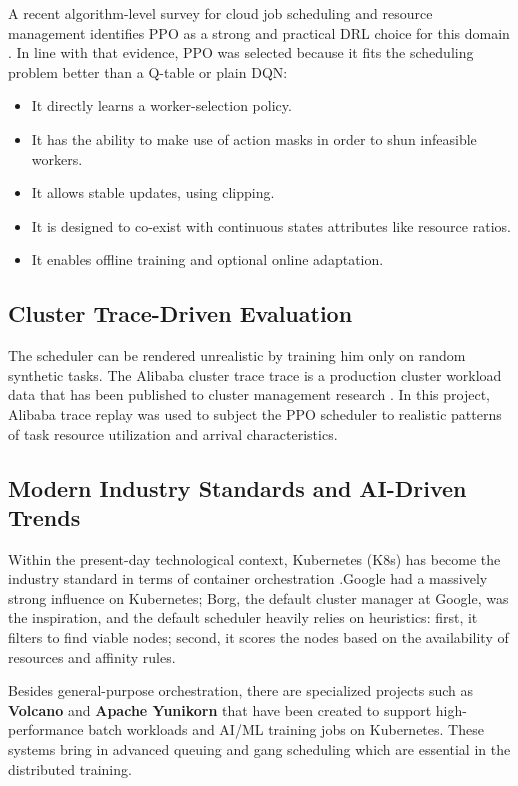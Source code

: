 A recent algorithm-level survey for cloud job scheduling and resource management identifies PPO as a strong and practical DRL choice for this domain \cite{gu2025deeprl}. In line with that evidence, PPO was selected because it fits the scheduling problem better than a Q-table or plain DQN:

\begin{itemize}
    \item It directly learns a worker-selection policy.
    \item It has the ability to make use of action masks in order to shun infeasible workers.
    \item It allows stable updates, using clipping.
    \item It is designed to co-exist with continuous states attributes like resource ratios.
    \item It enables offline training and optional online adaptation.
\end{itemize}

\subsection{Cluster Trace-Driven Evaluation}

The scheduler can be rendered unrealistic by training him only on random synthetic tasks. The Alibaba cluster trace trace is a production cluster workload data that has been published to cluster management research \cite{alibabatrace}. In this project, Alibaba trace replay was used to subject the PPO scheduler to realistic patterns of task resource utilization and arrival characteristics.

\subsection{Modern Industry Standards and AI-Driven Trends}

Within the present-day technological context, Kubernetes (K8s) has become the industry standard in terms of container orchestration \cite{kubernetes2026}.Google had a massively strong influence on Kubernetes; Borg, the default cluster manager at Google, was the inspiration, and the default scheduler heavily relies on heuristics: first, it filters to find viable nodes; second, it scores the nodes based on the availability of resources and affinity rules.

Besides general-purpose orchestration, there are specialized projects such as \textbf{Volcano} \cite{volcano2025} and \textbf{Apache Yunikorn} \cite{yunikorn2025} that have been created to support high-performance batch workloads and AI/ML training jobs on Kubernetes. These systems bring in advanced queuing and gang scheduling which are essential in the distributed training.

